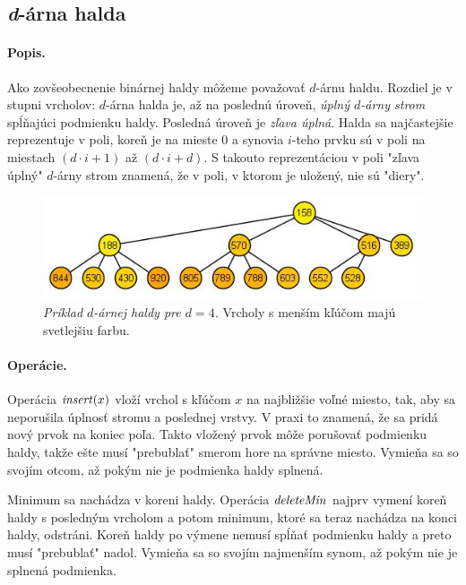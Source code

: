 \def\find{\mathop{\mathit{find}}}
\def\delete{\mathop{\mathit{delete}}}

\subsection{\emph{d}-árna halda} 
\paragraph{Popis.}
Ako zovšeobecnenie binárnej haldy môžeme považovať $d$-árnu haldu. Rozdiel je v stupni vrcholov:
$d$-árna halda je, až na poslednú úroveň, \emph{úplný $d$-árny strom} spĺňajúci podmienku haldy. Posledná úroveň je 
\emph{zľava úplná}.
Halda sa najčastejšie reprezentuje v poli, koreň je na mieste $0$ a synovia $i$-teho prvku sú v poli na miestach 
$(d\cdot i + 1)$ až $(d\cdot i + d)$.
S takouto reprezentáciou v poli "zľava úplný" $d$-árny strom znamená, že v poli, v ktorom je uložený, nie sú "diery". 

\begin{figure}
\includegraphics[width=\columnwidth]{obrazky/daryheap.png}
\caption{\emph{Príklad $d$-árnej haldy pre $d = 4$.} Vrcholy s menším kľúčom majú svetlejšiu farbu.} 
\label{img:komp} 
\end{figure}

\paragraph{Operácie.}
Operácia $\mathop{\mathit{insert}}(x)$ vloží vrchol s kľúčom $x$ na najbližšie voľné miesto, tak, aby sa neporušila úplnosť stromu 
a poslednej vrstvy. V praxi to znamená, že sa pridá nový prvok na koniec poľa. Takto vložený prvok môže porušovať 
podmienku haldy, takže ešte musí "prebublať" smerom hore na správne miesto. Vymieňa sa so svojím otcom, až pokým 
nie je podmienka haldy splnená.

Minimum sa nachádza v koreni haldy. Operácia $\mathop{\mathit{deleteMin}}$ najprv vymení koreň haldy s posledným vrcholom a potom 
minimum, ktoré sa teraz nachádza na konci haldy, odstráni. Koreň haldy po výmene nemusí spĺňať podmienku haldy a 
preto musí "prebublať" nadol. Vymieňa sa so svojím najmenším synom, až pokým nie je splnená podmienka.


